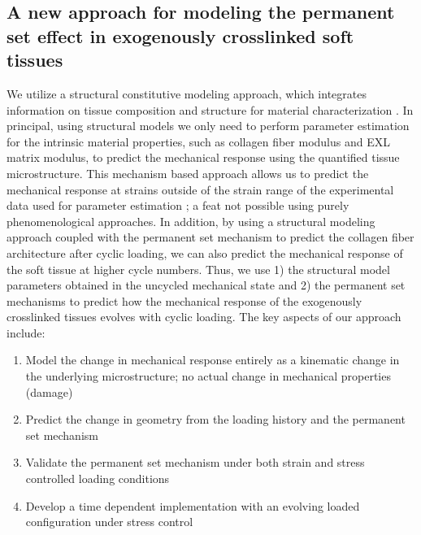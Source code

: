 
\subsection{A new approach for modeling the permanent set effect in exogenously crosslinked soft tissues}

	We utilize a structural constitutive modeling approach, which integrates information on tissue composition and structure for material characterization \cite{sacks_structural_2000}. In principal, using structural models we only need to perform parameter estimation for the intrinsic material properties, such as collagen fiber modulus and EXL matrix modulus, to predict the mechanical response using the quantified tissue microstructure. This mechanism based approach allows us to predict the mechanical response at strains outside of the strain range of the experimental data used for parameter estimation \cite{zhang_meso_2016, fata_insights_2014}; a feat not possible using purely phenomenological approaches. In addition, by using a structural modeling approach coupled with the permanent set mechanism to predict the collagen fiber architecture after cyclic loading, we can also predict the mechanical response of the soft tissue at higher cycle numbers. Thus, we use 1) the structural model parameters obtained in the uncycled mechanical state and 2) the permanent set mechanisms to predict how the mechanical response of the exogenously crosslinked tissues evolves with cyclic loading. The key aspects of our approach include:
\begin{enumerate}
\item Model the change in mechanical response entirely as a kinematic change in the underlying microstructure; no actual change in mechanical properties (damage)
\item Predict the change in geometry from the loading history and the permanent set mechanism
\item Validate the permanent set mechanism under both strain and stress controlled loading conditions
\item Develop a time dependent implementation with an evolving loaded configuration under stress control
\end{enumerate}